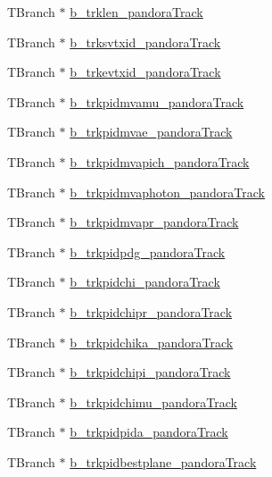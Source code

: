 \begin{DoxyCompactItemize}
\item 
T\-Branch $\ast$ \hyperlink{classanatree_a93475fed52d95766aca06675d262da2f}{b\-\_\-trklen\-\_\-pandora\-Track}
\item 
T\-Branch $\ast$ \hyperlink{classanatree_af41fa3b3917603256c23c0992d2b6f92}{b\-\_\-trksvtxid\-\_\-pandora\-Track}
\item 
T\-Branch $\ast$ \hyperlink{classanatree_a4ec2081d324c9899ab98369a8855c199}{b\-\_\-trkevtxid\-\_\-pandora\-Track}
\item 
T\-Branch $\ast$ \hyperlink{classanatree_a3b45b5181c44103280780aae822217f9}{b\-\_\-trkpidmvamu\-\_\-pandora\-Track}
\item 
T\-Branch $\ast$ \hyperlink{classanatree_a7b901d4df3119547ad3f6a8b9c09bb80}{b\-\_\-trkpidmvae\-\_\-pandora\-Track}
\item 
T\-Branch $\ast$ \hyperlink{classanatree_abab57531ca161288dec06c6c678344de}{b\-\_\-trkpidmvapich\-\_\-pandora\-Track}
\item 
T\-Branch $\ast$ \hyperlink{classanatree_a53bf5d9835d4fc61762f0049955d2621}{b\-\_\-trkpidmvaphoton\-\_\-pandora\-Track}
\item 
T\-Branch $\ast$ \hyperlink{classanatree_a9a8d8fee5ba81cc3db424a0f899c05c9}{b\-\_\-trkpidmvapr\-\_\-pandora\-Track}
\item 
T\-Branch $\ast$ \hyperlink{classanatree_a245620b28a0541c6a096ab2783d26ba6}{b\-\_\-trkpidpdg\-\_\-pandora\-Track}
\item 
T\-Branch $\ast$ \hyperlink{classanatree_af7835b48b7035a4388baac75dddcda40}{b\-\_\-trkpidchi\-\_\-pandora\-Track}
\item 
T\-Branch $\ast$ \hyperlink{classanatree_a992ceb21d01762710cbceeeea8121e1a}{b\-\_\-trkpidchipr\-\_\-pandora\-Track}
\item 
T\-Branch $\ast$ \hyperlink{classanatree_a3680e58f1171adfe074e3150c282b194}{b\-\_\-trkpidchika\-\_\-pandora\-Track}
\item 
T\-Branch $\ast$ \hyperlink{classanatree_aa7e82ff617304684607f87b3e4af3f73}{b\-\_\-trkpidchipi\-\_\-pandora\-Track}
\item 
T\-Branch $\ast$ \hyperlink{classanatree_ad6ce539e70ae297ffe986e93a0ff8450}{b\-\_\-trkpidchimu\-\_\-pandora\-Track}
\item 
T\-Branch $\ast$ \hyperlink{classanatree_a4f90841d6ff60ac22137e2bf9abe6b6b}{b\-\_\-trkpidpida\-\_\-pandora\-Track}
\item 
T\-Branch $\ast$ \hyperlink{classanatree_ad917a19da9b5840ed834b682c57a8d79}{b\-\_\-trkpidbestplane\-\_\-pandora\-Track}

\end{DoxyCompactItemize}

